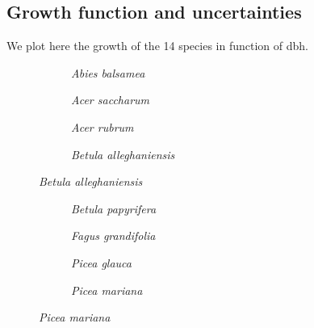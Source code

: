 \begin{refsection}
\subsection{Growth function and uncertainties}
We plot here the growth of the 14 species in function of dbh.
\begin{figure}[htb] %
	\centering
	\begin{subfigure}{0.48\textwidth}
		
		\caption{\textit{Abies balsamea}}
		\label{fig::abibal_G_dbh}
	\end{subfigure}
	\hfill
	\begin{subfigure}{0.48\textwidth}
		
		\caption{\textit{Acer saccharum}}
		\label{fig::acesac_G_dbh}
	\end{subfigure}
	\medskip
	\begin{subfigure}{0.48\textwidth}
		
		\caption{\textit{Acer rubrum}}
		\label{fig::acerub_G_dbh}
	\end{subfigure}
	\hfill
	\begin{subfigure}{0.48\textwidth}
		
		\caption{\textit{Betula alleghaniensis}}
		\label{fig::betal_G_dbh}
	\end{subfigure}
\end{figure}

\begin{figure}[htb] \ContinuedFloat %
	\centering
	\begin{subfigure}{0.48\textwidth}
		
		\caption{\textit{Betula papyrifera}}
		\label{fig::betap_G_dbh}
	\end{subfigure}
	\hfil
	\begin{subfigure}{0.48\textwidth}
		
		\caption{\textit{Fagus grandifolia}}
		\label{fig::faggran_G_dbh}
	\end{subfigure}
	\medskip
	\begin{subfigure}{0.48\textwidth}
		
		\caption{\textit{Picea glauca}}
		\label{fig::picgla_G_dbh}
	\end{subfigure}
	\hfil
	\begin{subfigure}{0.48\textwidth}
		
		\caption{\textit{Picea mariana}}
		\label{fig::picmar_G_dbh}
	\end{subfigure}
\end{figure}


\end{refsection}
